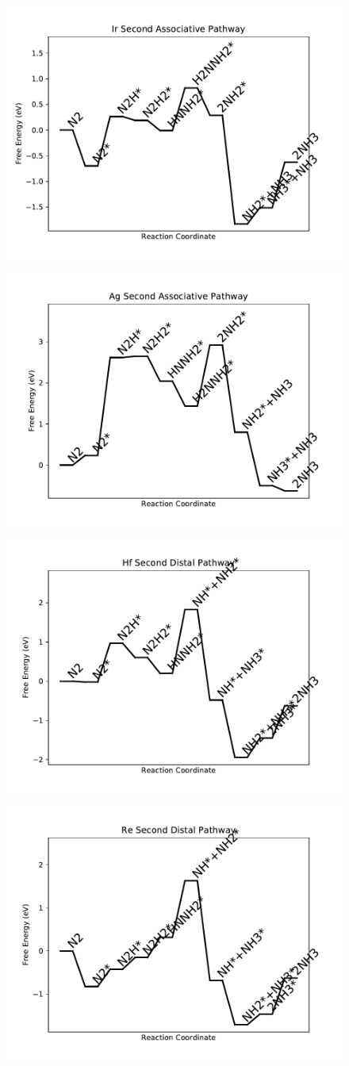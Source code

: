 \begin{figure}
\includegraphics[width=0.5\linewidth]{data/plots/Ir_associative_2.pdf}
\label{fig:Ir_associative_2}
\end{figure}

\begin{figure}
\includegraphics[width=0.5\linewidth]{data/plots/Ag_associative_2.pdf}
\label{fig:Ag_associative_2}
\end{figure}

\begin{figure}
\includegraphics[width=0.5\linewidth]{data/plots/Hf_distal_2.pdf}
\label{fig:Hf_distal_2}
\end{figure}

\begin{figure}
\includegraphics[width=0.5\linewidth]{data/plots/Re_distal_2.pdf}
\label{fig:Re_distal_2}
\end{figure}

